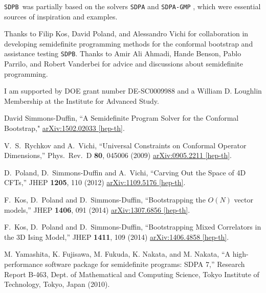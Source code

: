\documentclass[12pt]{article}
\numberwithin{equation}{section}
\newcommand\SDPB{\texttt{SDPB}}
\begin{document}
\SDPB\ was partially based on the solvers \texttt{SDPA} and
\texttt{SDPA-GMP} \cite{SDPA,SDPA2,SDPAGMP}, which were essential
sources of inspiration and examples.

Thanks to Filip Kos, David Poland, and Alessandro Vichi for collaboration in developing semidefinite programming methods for the conformal bootstrap and assistance testing \SDPB.  Thanks to Amir Ali Ahmadi, Hande Benson, Pablo Parrilo, and Robert Vanderbei for advice and discussions about semidefinite programming.

I am supported by DOE grant number DE-SC0009988 and a William D. Loughlin Membership at the Institute for Advanced Study.


\begin{thebibliography}{9}

  David Simmons-Duffin,
  ``A Semidefinite Program Solver for the Conformal Bootstrap,"
  \href{http://arxiv.org/abs/1502.02033}{arXiv:1502.02033 [hep-th]}.

  V.~S.~Rychkov and A.~Vichi,
  ``Universal Constraints on Conformal Operator Dimensions,''
  Phys.\ Rev.\ D {\bf 80}, 045006 (2009)
  \href{http://arxiv.org/abs/0905.2211}{arXiv:0905.2211 [hep-th]}.

  D.~Poland, D.~Simmons-Duffin and A.~Vichi,
  ``Carving Out the Space of 4D CFTs,''
  JHEP {\bf 1205}, 110 (2012)
  \href{http://arXiv.org/abs/1109.5176}{arXiv:1109.5176 [hep-th]}.
  
  F.~Kos, D.~Poland and D.~Simmons-Duffin,
  ``Bootstrapping the $O(N)$ vector models,''
  JHEP {\bf 1406}, 091 (2014)
  \href{http://arXiv.org/abs/1307.6856}{arXiv:1307.6856 [hep-th]}.

  F.~Kos, D.~Poland and D.~Simmons-Duffin,
  ``Bootstrapping Mixed Correlators in the 3D Ising Model,''
  JHEP {\bf 1411}, 109 (2014)
  \href{http://arXiv.org/abs/1406.4858}{arXiv:1406.4858 [hep-th]}.

  M. Yamashita, K. Fujisawa, M. Fukuda, K. Nakata, and M. Nakata,
  ``A high-performance software package for semidefinite programs: SDPA 7,''
   Research Report B-463, Dept. of Mathematical and Computing Science, Tokyo Institute of Technology, Tokyo, Japan (2010).


\end{thebibliography}
\end{document}
